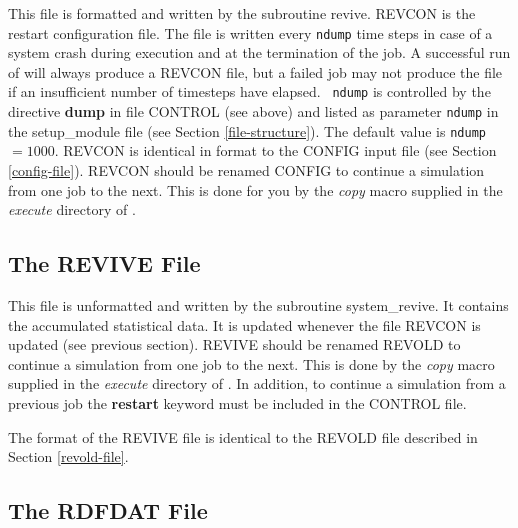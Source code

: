 This file is formatted and written by the subroutine {\sc revive}.
REVCON is the restart configuration file.  The file is written every
{\tt ndump} time steps in case of a system crash during execution
and at the termination of the job.  A successful run of \D will
always produce a REVCON file, but a failed job may not produce the
file if an insufficient number of timesteps have elapsed.  {\tt
ndump} is controlled by the directive {\bf dump} in file CONTROL
(see above) and listed as parameter {\tt ndump} in the {\sc
setup\_module} file (see Section \ref{file-structure}). The default
value is {\tt ndump} $=1000$.  REVCON is identical in format to the
CONFIG input file (see Section \ref{config-file}).  REVCON should be
renamed CONFIG to continue a simulation from one job to the next.
This is done for you by the {\sl copy} macro supplied in the {\em
execute} directory of \D.

\subsection{The REVIVE File}
\label{revive-file}

This file is unformatted and written by the subroutine {\sc
system\_revive}.  It contains the accumulated statistical data. It
is updated whenever the file REVCON is updated (see previous
section).  REVIVE should be renamed REVOLD to continue a
simulation from one job to the next.  This is done by the {\sl
copy} macro supplied in the {\em execute} directory of \D.  In
addition, to continue a simulation from a previous job the {\bf
restart} keyword must be included in the CONTROL file.

The format of the REVIVE file is identical to the REVOLD file
described in Section \ref{revold-file}.

\subsection{The RDFDAT File}
\label{rdf-file}

